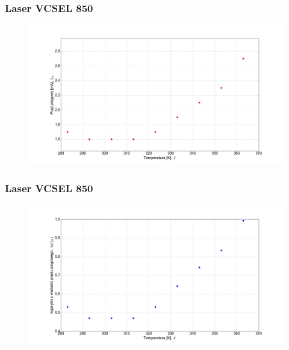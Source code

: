 \documentclass[xcolor={dvipsnames,table}]{beamer}
\begin{document}
\begin{frame}
\frametitle{Laser VCSEL 850}
\center
\begin{figure}
   \includegraphics[width=1.10\textwidth,natwidth=69,natheight=87]{vcsel850/plot_lin_i_th.png}
\end{figure}
\end{frame}

\begin{frame}
\frametitle{Laser VCSEL 850}
\center
\begin{figure}
   \includegraphics[width=1.10\textwidth,natwidth=69,natheight=87]{vcsel850/plot_log_i_th.png}
\end{figure}
\end{frame}
\end{document}
